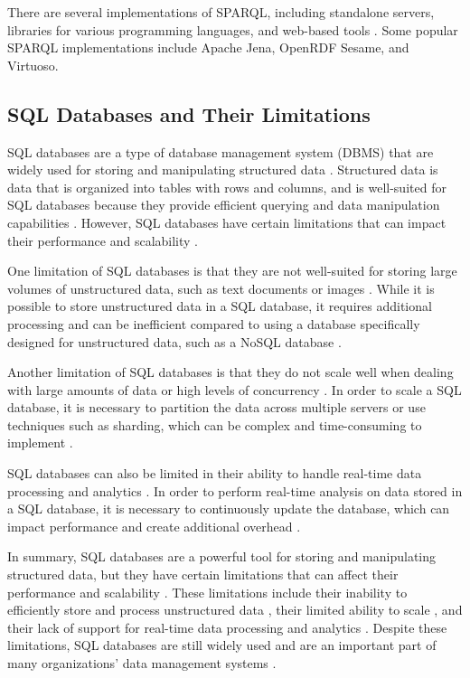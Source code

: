 There are several implementations of SPARQL, including standalone servers, libraries for various programming languages, and web-based tools \citep{sparql22i}.  Some popular SPARQL implementations include Apache Jena, OpenRDF Sesame, and Virtuoso.

\subsection{SQL Databases and Their Limitations}
SQL databases are a type of database management system (DBMS) that are widely used for storing and manipulating structured data \citep{garcia2008database}.  Structured data is data that is organized into tables with rows and columns, and is well-suited for SQL databases because they provide efficient querying and data manipulation capabilities \citep{ramez2016fundamentals}.  However, SQL databases have certain limitations that can impact their performance and scalability \citep{chen2014data}.

One limitation of SQL databases is that they are not well-suited for storing large volumes of unstructured data, such as text documents or images \citep{chen2014data}.  While it is possible to store unstructured data in a SQL database, it requires additional processing and can be inefficient compared to using a database specifically designed for unstructured data, such as a NoSQL database \citep{kleppmann2019designing}.

Another limitation of SQL databases is that they do not scale well when dealing with large amounts of data or high levels of concurrency \citep{kleppmann2019designing}\citep{chen2014data}.  In order to scale a SQL database, it is necessary to partition the data across multiple servers or use techniques such as sharding, which can be complex and time-consuming to implement \citep{ramez2016fundamentals}.

SQL databases can also be limited in their ability to handle real-time data processing and analytics \citep{kleppmann2019designing}\citep{chen2014data}.  In order to perform real-time analysis on data stored in a SQL database, it is necessary to continuously update the database, which can impact performance and create additional overhead \citep{garcia2008database}.

In summary, SQL databases are a powerful tool for storing and manipulating structured data, but they have certain limitations that can affect their performance and scalability \citep{kleppmann2019designing}\citep{chen2014data}.  These limitations include their inability to efficiently store and process unstructured data \citep{chen2014data}, their limited ability to scale \citep{ramez2016fundamentals}, and their lack of support for real-time data processing and analytics \citep{garcia2008database}.  Despite these limitations, SQL databases are still widely used and are an important part of many organizations' data management systems \citep{ramez2016fundamentals}.

